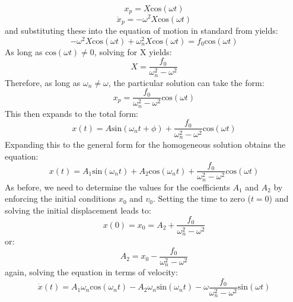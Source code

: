 \documentclass[12pt,letter]{article}
\numberwithin{ex}{section} %
\numberwithin{re}{section} %
\begin{document}
			\begin{equation}
				x_p = X\text{cos}(\omega t)
			\end{equation}	
			\begin{equation}
				\ddot{x}_p = -\omega^2X\text{cos}(\omega t)
			\end{equation}				
			and substituting these into the equation of motion in standard from yields:
			\begin{equation}
				-\omega^2X\text{cos}(\omega t)+\omega_n^2X\text{cos}(\omega t) = f_0\text{cos}(\omega t)
			\end{equation}		
			As long as 	$\text{cos}(\omega t) \neq  0$, solving for X yields:
			\begin{equation}
				X = \frac{f_0}{\omega_n^2-\omega^2}
				\label{eq:X}
			\end{equation}		
			Therefore, as long as $\omega_n \neq \omega$, the particular solution can take the form:
			\begin{equation}
				x_p = \frac{f_0}{\omega_n^2-\omega^2}\text{cos}(\omega t)
			\end{equation}						
			This then expands to the total form:
			\begin{equation}
				x(t) = A\text{sin}(\omega_n t + \phi) + \frac{f_0}{\omega_n^2-\omega^2}\text{cos}(\omega t)
			\end{equation}				
			Expanding this to the general form for the homogeneous solution obtains the equation:
			\begin{equation}
				x(t) = A_1\text{sin}(\omega_n t) + A_2\text{cos}(\omega_n t) + \frac{f_0}{\omega_n^2-\omega^2}\text{cos}(\omega t)
			\end{equation}				
			As before, we need to determine the values for the coefficients $A_1$ and $A_2$ by enforcing the initial conditions $x_0$ and $v_0$. Setting the time to zero ($t=0$) and solving the initial displacement leads to:
			\begin{equation}
				x(0) = x_0 = A_2 + \frac{f_0}{\omega_n^2-\omega^2}
			\end{equation}				
			or:
			\begin{equation}
				A_2 = x_0-\frac{f_0}{\omega_n^2-\omega^2}
			\end{equation}	
			again, solving the equation in terms of velocity:
			\begin{equation}
				\dot{x}(t) = A_1\omega_n\text{cos}(\omega_n t) - A_2 \omega_n \text{sin}(\omega_n t) - \omega \frac{f_0}{\omega_n^2-\omega^2}\text{sin}(\omega t)
			\end{equation}	
\end{document}
